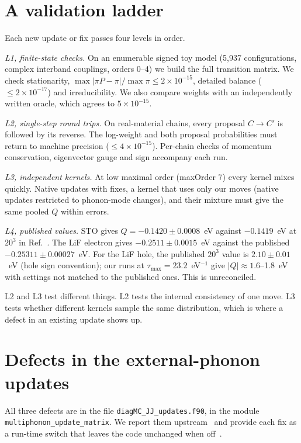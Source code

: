 \documentclass[aps,prb,reprint,superscriptaddress,nofootinbib]{revtex4-2}
\newcommand{\code}[1]{\texttt{#1}}
\begin{document}
\section{A validation ladder}
\label{sec:ladder}

Each new update or fix passes four levels in order.

\emph{L1, finite-state checks.} On an enumerable signed toy model (5,937 configurations, complex interband couplings, orders 0--4) we build the full transition matrix. We check stationarity, $\max|\pi P-\pi|/\max\pi\le2\times10^{-15}$, detailed balance ($\le2\times10^{-17}$) and irreducibility. We also compare weights with an independently written oracle, which agrees to $5\times10^{-15}$.

\emph{L2, single-step round trips.} On real-material chains, every proposal $C\to C'$ is followed by its reverse. The log-weight and both proposal probabilities must return to machine precision ($\le4\times10^{-15}$). Per-chain checks of momentum conservation, eigenvector gauge and sign accompany each run.

\emph{L3, independent kernels.} At low maximal order (maxOrder 7) every kernel mixes quickly. Native updates with fixes, a kernel that uses only our moves (native updates restricted to phonon-mode changes), and their mixture must give the same pooled $Q$ within errors.

\emph{L4, published values.} STO gives $Q=-0.1420\pm0.0008$~eV against $-0.1419$~eV at $20^3$ in Ref.~. The LiF electron gives $-0.2511\pm0.0015$~eV against the published $-0.25311\pm0.00027$~eV. For the LiF hole, the published $20^3$ value is $2.10\pm0.01$~eV (hole sign convention); our runs at $\tau_{\max}=23.2$~eV$^{-1}$ give $|Q|\approx1.6$--1.8~eV with settings not matched to the published ones. This is unreconciled.

L2 and L3 test different things. L2 tests the internal consistency of one move. L3 tests whether different kernels sample the same distribution, which is where a defect in an existing update shows up.

\section{Defects in the external-phonon updates}
\label{sec:defects}

All three defects are in the file \code{diagMC\_JJ\_updates.f90}, in the module \code{multiphonon\_update\_matrix}. We report them upstream~\cite{UpstreamIssue} and provide each fix as a run-time switch that leaves the code unchanged when off~\cite{FutureB}.
\end{document}
